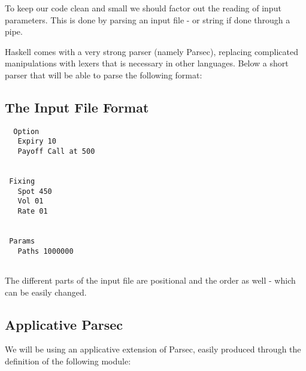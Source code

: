 \documentclass{scrartcl}
\begin{document}
To keep our code clean and small we should factor out the reading of input parameters. This is done by parsing an input file - or string if done through a pipe.

Haskell comes with a very strong parser (namely Parsec), replacing complicated manipulations with lexers that is necessary in other languages. Below a short parser that will be able to parse the following format:

\subsection{The Input File Format}

\begin{tabbing}\tt
~Option~\\
\tt ~~~Expiry~10\\
\tt ~~~Payoff~Call~at~500\\
\tt ~\\
\tt ~\\
\tt ~Fixing~\\
\tt ~~~Spot~450\\
\tt ~~~Vol~01\\
\tt ~~~Rate~01\\
\tt ~\\
\tt ~\\
\tt ~Params~\\
\tt ~~~Paths~1000000\\
\tt ~
\end{tabbing}

The different parts of the input file are positional and the order as well - which can be easily changed.

\subsection{Applicative Parsec}

We will be using an applicative extension of Parsec, easily produced through the definition of the following module:
\end{document}
